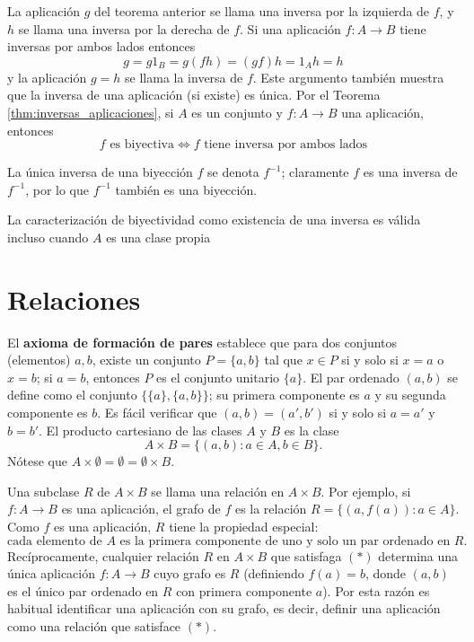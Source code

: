 La aplicación \( g \) del teorema anterior se llama una {inversa por la izquierda} de \( f \), y \( h \) se llama una {inversa por la derecha} de \( f \). Si una aplicación \( f: A \to B \) tiene inversas por ambos lados entonces
\[
g = g1_B = g(fh) = (gf)h = 1_A h = h
\]
y la aplicación \( g = h \) se llama la {inversa} de \( f \). Este argumento también muestra que la inversa de una aplicación (si existe) es única. Por el Teorema \ref{thm:inversas_aplicaciones}, si \( A \) es un conjunto y \( f: A \to B \) una aplicación, entonces
\[
f \text{ es biyectiva} \iff f \text{ tiene inversa por ambos lados}
\]

La única inversa de una biyección \( f \) se denota \( f^{-1} \); claramente \( f \) es una inversa de \( f^{-1} \), por lo que \( f^{-1} \) también es una biyección.

\begin{remark}
    La caracterización de biyectividad como existencia de una inversa es válida incluso cuando \( A \) es una clase propia
\end{remark}

\section{Relaciones}

El \textbf{axioma de formación de pares} establece que para dos conjuntos (elementos) \( a, b \), existe un conjunto \( P = \{a, b\} \) tal que \( x \in P \) si y solo si \( x = a \) o \( x = b \); si \( a = b \), entonces \( P \) es el {conjunto unitario} \( \{a\} \). El {par ordenado} \( (a, b) \) se define como el conjunto \( \{\{a\}, \{a, b\}\} \); su {primera componente} es \( a \) y su {segunda componente} es \( b \). Es fácil verificar que \( (a, b) = (a', b') \) si y solo si \( a = a' \) y \( b = b' \). El {producto cartesiano} de las clases \( A \) y \( B \) es la clase
\[
A \times B = \{(a, b) : a \in A, b \in B\}.
\]
Nótese que \( A \times \emptyset = \emptyset = \emptyset \times B \).

Una subclase \( R \) de \( A \times B \) se llama una {relación} en \( A \times B \). Por ejemplo, si \( f: A \to B \) es una aplicación, el grafo de \( f \) es la relación \( R = \{(a, f(a)) : a \in A\} \). Como \( f \) es una aplicación, \( R \) tiene la propiedad especial:
\[
\text{cada elemento de } A \text{ es la primera componente de uno y solo un par ordenado en } R. \tag{$*$}
\]
Recíprocamente, cualquier relación \( R \) en \( A \times B \) que satisfaga $(*)$ determina una única aplicación \( f: A \to B \) cuyo grafo es \( R \) (definiendo \( f(a) = b \), donde \( (a, b) \) es el único par ordenado en \( R \) con primera componente \( a \)). Por esta razón es habitual identificar una aplicación con su grafo, es decir, definir una aplicación como una relación que satisface $(*)$.

